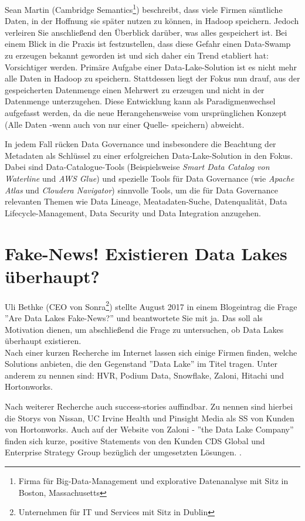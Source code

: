 \documentclass[twoside,twocolumn]{article}
\begin{document}
Sean Martin (Cambridge Semantics\footnote{Firma für Big-Data-Management und explorative Datenanalyse mit Sitz in Boston, Massachusetts}) beschreibt, dass viele Firmen sämtliche Daten, in der Hoffnung sie später nutzen zu können, in Hadoop speichern. Jedoch verleiren Sie anschließend den Überblick darüber, was alles gespeichert ist.
Bei einem Blick in die Praxis ist festzustellen, dass diese Gefahr einen Data-Swamp zu erzeugen bekannt geworden ist und sich daher ein Trend etabliert hat: Vorsichtiger werden. Primäre Aufgabe einer Data-Lake-Solution ist es nicht mehr alle Daten in Hadoop zu speichern. Stattdessen liegt der Fokus nun drauf, aus der gespeicherten Datenmenge einen Mehrwert zu erzeugen und nicht in der Datenmenge unterzugehen. \cite{src1} Diese Entwicklung kann als Paradigmenwechsel aufgefasst werden, da die neue Herangehensweise vom ursprünglichen Konzept (Alle Daten -wenn auch von nur einer Quelle- speichern) abweicht.

In jedem Fall rücken Data Governance und insbesondere die Beachtung der Metadaten als Schlüssel zu einer erfolgreichen Data-Lake-Solution in den Fokus. Dabei sind Data-Catalogue-Tools (Beispielsweise \textit{Smart Data Catalog von Waterline} und \textit{AWS Glue}) und spezielle Tools für Data Governance (wie \textit{Apache Atlas} und \textit{Cloudera Navigator}) sinnvolle Tools, um die für Data Governance relevanten Themen wie Data Lineage, Meatadaten-Suche, Datenqualität, Data Lifecycle-Management, Data Security und Data Integration anzugehen.\cite{src8}

\section{Fake-News! Existieren Data Lakes überhaupt?}
Uli Bethke (CEO von Sonra\footnote{Unternehmen für IT und Services mit Sitz in Dublin}) stellte August 2017 in einem Blogeintrag\cite{src4} die Frage ''Are Data Lakes Fake-News?'' und beantwortete Sie mit ja. Das soll als Motivation dienen, um abschließend die Frage zu untersuchen, ob Data Lakes überhaupt existieren.\\

Nach einer kurzen Recherche im Internet lassen sich einige Firmen finden, welche Solutions anbieten, die den Gegenstand ''Data Lake'' im Titel tragen. Unter anderem zu nennen sind: HVR, Podium Data, Snowflake, Zaloni\cite{c1}, Hitachi\cite{c2} und Hortonworks\cite{c3}.

Nach weiterer Recherche auch success-stories auffindbar. 
Zu nennen sind hierbei die Storys von Nissan\cite{s1}, UC Irvine Health\cite{s2} und Pinsight Media\cite{s3} als SS von Kunden von Hortonworks. Auch auf der Website von Zaloni - ''the Data Lake Company'' finden sich kurze, positive Statements von den Kunden CDS Global und Enterprise Strategy Group bezüglich der umgesetzten Lösungen.\cite{s4} .
\end{document}
